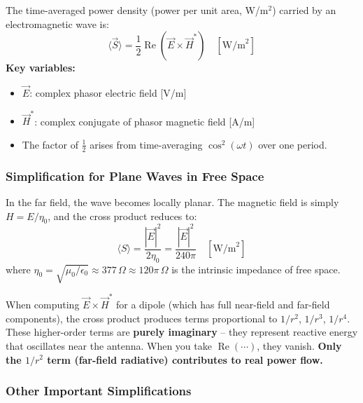 \documentclass[10pt,letterpaper]{article}
\newcommand{\vE}{\vec{E}}
\newcommand{\vH}{\vec{H}}
\newcommand{\Real}{\operatorname{Re}}
\begin{document}
\begin{tcolorbox}[formulabox, title={Core Definition: Time-Averaged Poynting Vector}]
The time-averaged power density (power per unit area, W/m$^2$) carried by an electromagnetic wave is:
\begin{equation}
  \langle\vec{S}\rangle = \frac{1}{2}\Real\!\left(\vE\times\vH^*\right) \quad [\text{W/m}^2]
\end{equation}
\textbf{Key variables:}
\begin{itemize}[noitemsep]
  \item $\vE$: complex phasor electric field [V/m]
  \item $\vH^*$: complex conjugate of phasor magnetic field [A/m]
  \item The factor of $\frac{1}{2}$ arises from time-averaging $\cos^2(\omega t)$ over one period.
\end{itemize}
\end{tcolorbox}

\subsubsection{Simplification for Plane Waves in Free Space}
In the far field, the wave becomes locally planar. The magnetic field is simply $H = E/\eta_0$, and the cross product reduces to:
\begin{equation}
  \boxed{\langle S\rangle = \frac{|\vE|^2}{2\eta_0} = \frac{|\vE|^2}{240\pi} \quad [\text{W/m}^2]}
\end{equation}
where $\eta_0 = \sqrt{\mu_0/\epsilon_0} \approx 377\,\Omega \approx 120\pi\,\Omega$ is the intrinsic impedance of free space.

\begin{tcolorbox}[warningbox, title={Critical Test Simplification: Reactive vs.\ Radiative Terms}]
When computing $\vE\times\vH^*$ for a dipole (which has full near-field and far-field components), the cross product produces terms proportional to $1/r^2$, $1/r^3$, $1/r^4$. These higher-order terms are \textbf{purely imaginary} -- they represent reactive energy that oscillates near the antenna. When you take $\Real(\cdots)$, they vanish. \textbf{Only the $1/r^2$ term (far-field radiative) contributes to real power flow.}
\end{tcolorbox}

\subsubsection{Other Important Simplifications}
\end{document}
